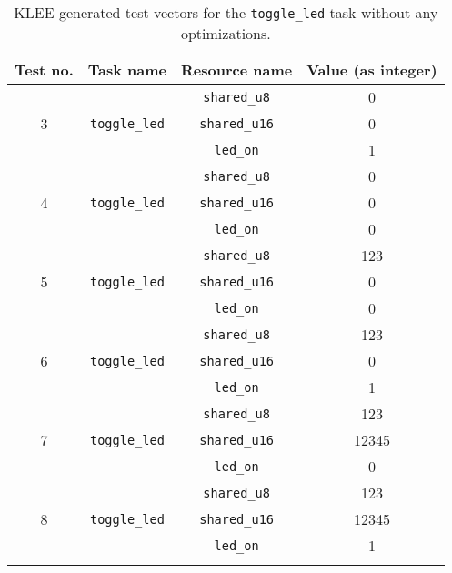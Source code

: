 \begin{longtable}{|c|c|c|c|}
\hline
Test no. & Task name & Resource name & Value (as integer) \\ \hline
\multirow{3}{*}{3} & \multirow{3}{*}{\texttt{toggle\_led}} & \texttt{shared\_u8}  & 0 \\ \cline{3-4}
                   &                                       & \texttt{shared\_u16} & 0 \\ \cline{3-4}
                   &                                       & \texttt{led\_on}     & 1 \\ \hline
\multirow{3}{*}{4} & \multirow{3}{*}{\texttt{toggle\_led}} & \texttt{shared\_u8}  & 0 \\ \cline{3-4}
                   &                                       & \texttt{shared\_u16} & 0 \\ \cline{3-4}
                   &                                       & \texttt{led\_on}     & 0 \\ \hline
\multirow{3}{*}{5} & \multirow{3}{*}{\texttt{toggle\_led}} & \texttt{shared\_u8}  & 123 \\ \cline{3-4}
                   &                                       & \texttt{shared\_u16} & 0 \\ \cline{3-4}
                   &                                       & \texttt{led\_on}     & 0 \\ \hline
\multirow{3}{*}{6} & \multirow{3}{*}{\texttt{toggle\_led}} & \texttt{shared\_u8}  & 123 \\ \cline{3-4}
                   &                                       & \texttt{shared\_u16} & 0 \\ \cline{3-4}
                   &                                       & \texttt{led\_on}     & 1 \\ \hline
\multirow{3}{*}{7} & \multirow{3}{*}{\texttt{toggle\_led}} & \texttt{shared\_u8}  & 123 \\ \cline{3-4}
                   &                                       & \texttt{shared\_u16} & 12345 \\ \cline{3-4}
                   &                                       & \texttt{led\_on}     & 0 \\ \hline
\multirow{3}{*}{8} & \multirow{3}{*}{\texttt{toggle\_led}} & \texttt{shared\_u8}  & 123 \\ \cline{3-4}
                   &                                       & \texttt{shared\_u16} & 12345 \\ \cline{3-4}
                   &                                       & \texttt{led\_on}      & 1 \\ \hline
\caption{KLEE generated test vectors for the \texttt{toggle\_led} task without any optimizations.}
\label{tab:evaldebugteststoggle}
\end{longtable}


